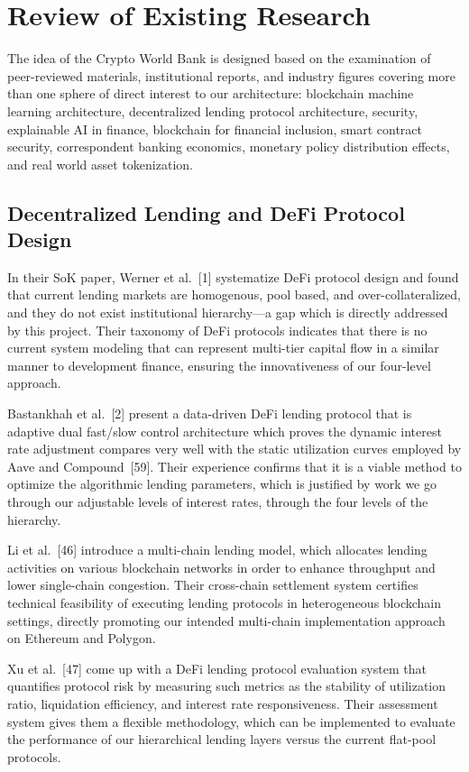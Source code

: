 \documentclass[12pt,a4paper]{report}
\begin{document}
\section{Review of Existing Research}

The idea of the Crypto World Bank is designed based on the examination of peer-reviewed materials, institutional reports, and industry figures covering more than one sphere of direct interest to our architecture: blockchain machine learning architecture, decentralized lending protocol architecture, security, explainable AI in finance, blockchain for financial inclusion, smart contract security, correspondent banking economics, monetary policy distribution effects, and real world asset tokenization.

\subsection{Decentralized Lending and DeFi Protocol Design}

In their SoK paper, Werner et al.~[1] systematize DeFi protocol design and found that current lending markets are homogenous, pool based, and over-collateralized, and they do not exist institutional hierarchy---a gap which is directly addressed by this project. Their taxonomy of DeFi protocols indicates that there is no current system modeling that can represent multi-tier capital flow in a similar manner to development finance, ensuring the innovativeness of our four-level approach.

Bastankhah et al.~[2] present a data-driven DeFi lending protocol that is adaptive dual fast/slow control architecture which proves the dynamic interest rate adjustment compares very well with the static utilization curves employed by Aave and Compound~[59]. Their experience confirms that it is a viable method to optimize the algorithmic lending parameters, which is justified by work we go through our adjustable levels of interest rates, through the four levels of the hierarchy.

Li et al.~[46] introduce a multi-chain lending model, which allocates lending activities on various blockchain networks in order to enhance throughput and lower single-chain congestion. Their cross-chain settlement system certifies technical feasibility of executing lending protocols in heterogeneous blockchain settings, directly promoting our intended multi-chain implementation approach on Ethereum and Polygon.

Xu et al.~[47] come up with a DeFi lending protocol evaluation system that quantifies protocol risk by measuring such metrics as the stability of utilization ratio, liquidation efficiency, and interest rate responsiveness. Their assessment system gives them a flexible methodology, which can be implemented to evaluate the performance of our hierarchical lending layers versus the current flat-pool protocols.
\end{document}
